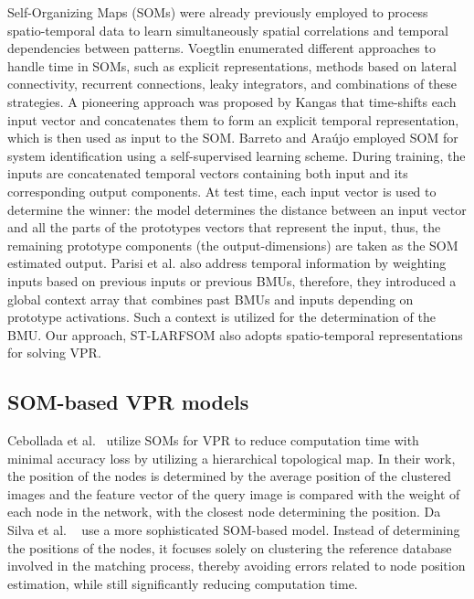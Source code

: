 \documentclass[letterpaper, 10 pt, conference]{ieeeconf}  %
\begin{document}
Self-Organizing Maps (SOMs) were already previously employed to process spatio-temporal data to learn simultaneously spatial correlations and temporal dependencies between patterns. Voegtlin \cite{oldtempsom2} enumerated different approaches to handle time in SOMs, such as explicit representations, methods based on lateral connectivity, recurrent connections, leaky integrators, and combinations of these strategies. A pioneering approach was proposed by Kangas \cite{kangasthesis} that time-shifts each input vector and concatenates them to form an explicit temporal representation, which is then used as input to the SOM. Barreto and Araújo \cite{oldtempsom2} employed SOM for system identification using a self-supervised learning scheme. During training, the inputs are concatenated temporal vectors containing both input and its corresponding output components. At test time, each input vector is used to determine the winner: the model determines the distance between an input vector and all the parts of the prototypes vectors that represent the input, thus, the remaining prototype components (the output-dimensions) are taken as the SOM estimated output. Parisi et al. \cite{tempsom2} also address temporal information by weighting inputs based on previous inputs or previous BMUs, therefore, they introduced a global context array that combines past BMUs and inputs depending on prototype activations. Such a context is utilized for the determination of the BMU. Our approach, ST-LARFSOM also adopts spatio-temporal representations for solving VPR.



\subsection{SOM-based VPR models}

Cebollada et al.~\cite{evaluation} utilize SOMs for \ac{VPR} to reduce computation time with minimal accuracy loss by utilizing a hierarchical topological map. In their work, the position of the nodes is determined by the average position of the clustered images and the feature vector of the query image is compared with the weight of each node in the network, with the closest node determining the position. Da Silva et al. ~\cite{scmusom} use a more sophisticated SOM-based model. Instead of determining the positions of the nodes, it focuses solely on clustering the reference database involved in the matching process, thereby avoiding errors related to node position estimation, while still significantly reducing computation time. 
\end{document}
